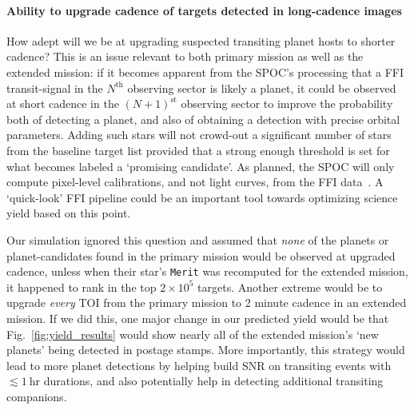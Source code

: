 \paragraph{Ability to upgrade cadence of targets detected in long-cadence images}
How adept will we be at upgrading suspected transiting planet hosts to shorter cadence?
This is an issue relevant to both \tesss primary mission as well as the extended mission:
if it becomes apparent from the SPOC's processing that a FFI transit-signal in the $N^\mathrm{th}$ observing sector is likely a planet, it could be observed at short cadence in the $(N+1)^\mathrm{st}$ observing sector to improve the probability both of detecting a planet, and also of obtaining a detection with precise orbital parameters.
Adding such stars will not crowd-out a significant number of stars from the baseline target list provided that a strong enough threshold is set for what becomes labeled a `promising candidate'.
As planned, the SPOC will only compute pixel-level calibrations, and not light curves, from the FFI data~\citep{jenkins_SPOC_2016}.
A `quick-look' FFI pipeline could be an important tool towards optimizing \tesss science yield based on this point.

Our simulation ignored this question and assumed that \textit{none} of the planets or planet-candidates found in the primary mission would be observed at upgraded cadence, unless when their star's \texttt{Merit} was recomputed for the extended mission, it happened to rank in the top $2\times10^5$ targets.
Another extreme would be to upgrade \textit{every} TOI from the primary mission to 2 minute cadence in an extended mission.
If we did this, one major change in our predicted yield would be that Fig.~\ref{fig:yield_results} would show nearly all of the extended mission's `new planets' being detected in postage stamps. 
More importantly, this strategy would lead to more planet detections by helping build SNR on transiting events with $\lesssim1\ \mathrm{hr}$ durations, and also potentially help in detecting additional transiting companions. 


